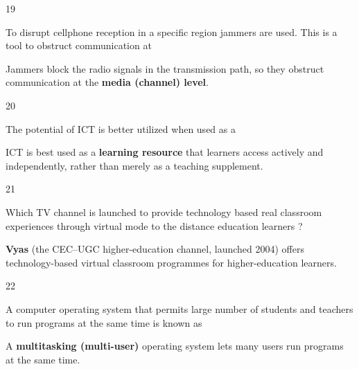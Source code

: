 \begin{question}{19}
{To disrupt cellphone reception in a specific region jammers are used. This is a tool to obstruct communication at\par}
\begin{explain}
Jammers block the radio signals in the transmission path, so they obstruct communication at the \textbf{media (channel) level}.
\end{explain}
\end{question}

\begin{question}{20}
{The potential of ICT is better utilized when used as a\par}
\begin{explain}
ICT is best used as a \textbf{learning resource} that learners access actively and independently, rather than merely as a teaching supplement.
\end{explain}
\end{question}

\begin{question}{21}
{Which TV channel is launched to provide technology based real classroom experiences through virtual mode to the distance education learners ?\par}
\begin{explain}
\textbf{Vyas} (the CEC--UGC higher-education channel, launched 2004) offers technology-based virtual classroom programmes for higher-education learners.
\end{explain}
\end{question}

\begin{question}{22}
{A computer operating system that permits large number of students and teachers to run programs at the same time is known as\par}
\begin{explain}
A \textbf{multitasking (multi-user)} operating system lets many users run programs at the same time.
\end{explain}
\end{question}

